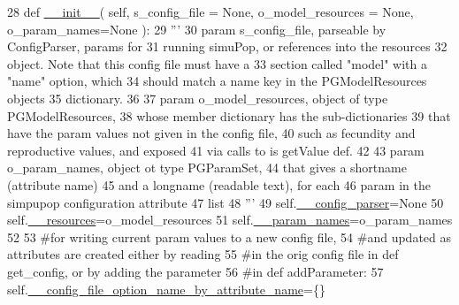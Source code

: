 \begin{DoxyCode}
28     \textcolor{keyword}{def }\hyperlink{classnegui_1_1pginputsimupop_1_1PGInputSimuPop_a1452a83a005c9d30e778b34ae67a399f}{\_\_init\_\_}( self, s\_config\_file = None, o\_model\_resources = None, o\_param\_names=None ):
29         \textcolor{stringliteral}{'''}
30 \textcolor{stringliteral}{        param s\_config\_file, parseable by ConfigParser, params for }
31 \textcolor{stringliteral}{            running simuPop, or references into the resources}
32 \textcolor{stringliteral}{            object.  Note that this config file must have a}
33 \textcolor{stringliteral}{            section called "model" with a "name" option, which}
34 \textcolor{stringliteral}{            should match a name key in the PGModelResources objects}
35 \textcolor{stringliteral}{            dictionary.}
36 \textcolor{stringliteral}{}
37 \textcolor{stringliteral}{        param o\_model\_resources, object of type PGModelResources,}
38 \textcolor{stringliteral}{            whose member dictionary has the sub-dictionaries}
39 \textcolor{stringliteral}{            that have the param values not given in the config file,}
40 \textcolor{stringliteral}{            such as fecundity and reproductive values, and exposed}
41 \textcolor{stringliteral}{            via calls to is getValue def.}
42 \textcolor{stringliteral}{}
43 \textcolor{stringliteral}{        param o\_param\_names, object ot type PGParamSet,}
44 \textcolor{stringliteral}{            that gives a shortname (attribute name)}
45 \textcolor{stringliteral}{            and a longname (readable text), for each }
46 \textcolor{stringliteral}{            param in the simpupop configuration attribute }
47 \textcolor{stringliteral}{            list}
48 \textcolor{stringliteral}{        '''}
49         self.\hyperlink{classnegui_1_1pginputsimupop_1_1PGInputSimuPop_af6628ecaa63a594fc96d1b9273fd1fd6}{\_\_config\_parser}=\textcolor{keywordtype}{None}
50         self.\hyperlink{classnegui_1_1pginputsimupop_1_1PGInputSimuPop_a6c00be5e58b61b239273e04c671cd9e8}{\_\_resources}=o\_model\_resources
51         self.\hyperlink{classnegui_1_1pginputsimupop_1_1PGInputSimuPop_a0a737393cb4d1c66062f9403296c7f19}{\_\_param\_names}=o\_param\_names
52 
53         \textcolor{comment}{#for writing current param values to a new config file,}
54         \textcolor{comment}{#and updated as attributes are created either by reading}
55         \textcolor{comment}{#in the orig config file in def get\_config, or by adding the parameter}
56         \textcolor{comment}{#in def addParameter:}
57         self.\hyperlink{classnegui_1_1pginputsimupop_1_1PGInputSimuPop_a893ab501191e9e1ed89f4f878310d97b}{\_\_config\_file\_option\_name\_by\_attribute\_name}=\{\}      

\end{DoxyCode}
